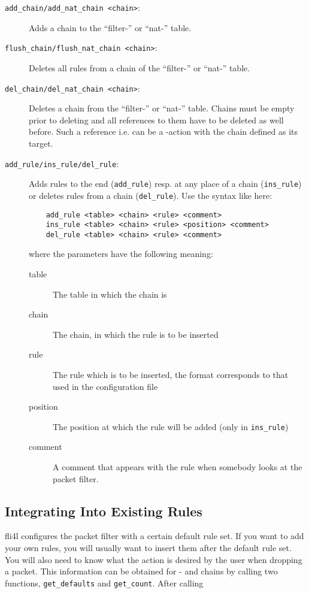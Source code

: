 \begin{description}
\item [\texttt{add\_chain/add\_nat\_chain <chain>}:]
  Adds a chain to the ``filter-'' or ``nat-'' table.
\item [\texttt{flush\_chain/flush\_nat\_chain <chain>}:]
  Deletes all rules from a chain of the ``filter-'' or ``nat-'' table.
\item [\texttt{del\_chain/del\_nat\_chain <chain>}:]
  Deletes a chain from the ``filter-'' or ``nat-'' table. Chains must be empty
  prior to deleting and all references to them have to be deleted as well before.
  Such a reference i.e. can be a -action with the chain defined
  as its target.
\item[\texttt{add\_rule/ins\_rule/del\_rule}:] Adds rules to the end
  (\texttt{add\_rule}) resp. at any place of a chain (\texttt{ins\_rule})
  or deletes rules from a chain (\texttt{del\_rule}). Use the syntax like here:

\begin{example}
\begin{verbatim}
    add_rule <table> <chain> <rule> <comment>
    ins_rule <table> <chain> <rule> <position> <comment>
    del_rule <table> <chain> <rule> <comment>
\end{verbatim}
\end{example}

  \noindent where the parameters have the following meaning:
  \begin{description}
  \item[table] The table in which the chain is
  \item[chain] The chain, in which the rule is to be inserted
  \item[rule] The rule which is to be inserted, the format
     corresponds to that used in the configuration file
  \item[position] The position at which the rule will be added (only
     in \texttt{ins\_rule})
  \item[comment] A comment that appears with the rule
     when somebody looks at the packet filter.
  \end{description}
\end{description}


\subsection{Integrating Into Existing Rules}

fli4l configures the packet filter with a certain default rule set.
If you want to add your own rules, you will usually want to insert
them after the default rule set. You will also need to know what the
action is desired by the user when dropping a packet. This information
can be obtained for
- and  chains by calling two functions,
\texttt{get\_defaults} and \texttt{get\_count}. After calling

